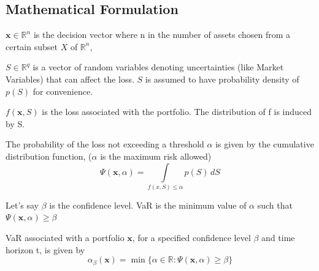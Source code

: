 \documentclass[conference]{IEEEtran}
\begin{document}
    
    
    

\subsection{Mathematical Formulation}
    
    $\textbf{x} \in \mathbb{R}^n$ is the decision vector where n in the number of assets chosen from a certain subset $X$ of $\mathbb{R}^n$,
    
    $S \in \mathbb{R}^q$ is a vector of random variables denoting uncertainties (like Market Variables) that can affect the loss. 
    $S$ is assumed to have probability density of $p(S)$ for convenience.
    
    $f(\textbf{x}, S)$ is the loss associated with the portfolio. The distribution of f is induced by S.
    
    The probability of the loss not exceeding a threshold $\alpha$ is given by the cumulative distribution function, ($\alpha$ is the maximum risk allowed)
    \begin{equation}
        \Psi(\textbf{x}, \alpha) = 
        \underset{f(x, S) \leq \alpha}{\int}
        p(S) \, dS
    \end{equation}
    
    Let's say $\beta$ is the confidence level. VaR is the minimum value of $\alpha$ such that 
    $ \Psi(\textbf{x}, \alpha) \geq \beta $
    
    VaR associated with a portfolio $\mathbf{x}$, for a specified confidence level $\beta$ and time horizon t, is given by
    \begin{equation}
        \alpha_\beta(\textbf{x}) =
        \min \{ 
        \alpha \in \mathbb{R}: 
        \Psi(\textbf{x}, \alpha) \geq \beta
        \}
    \end{equation}
    
\end{document}
